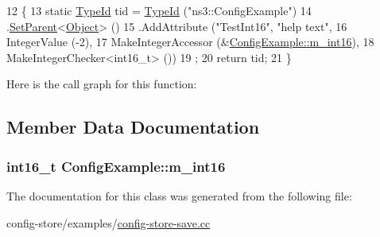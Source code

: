 \begin{DoxyCode}
12                                  \{
13     \textcolor{keyword}{static} \hyperlink{classns3_1_1TypeId}{TypeId} tid = \hyperlink{classns3_1_1TypeId}{TypeId} (\textcolor{stringliteral}{"ns3::ConfigExample"})
14       .\hyperlink{classns3_1_1TypeId_abaaca67ab7d2471067e7c275df0f7309}{SetParent}<\hyperlink{classns3_1_1Object}{Object}> ()
15       .AddAttribute (\textcolor{stringliteral}{"TestInt16"}, \textcolor{stringliteral}{"help text"},
16                      IntegerValue (-2),
17                      MakeIntegerAccessor (&\hyperlink{classConfigExample_a6811c9cb03e7c3f04090bb1fd20861c0}{ConfigExample::m\_int16}),
18                      MakeIntegerChecker<int16\_t> ())
19       ;
20       \textcolor{keywordflow}{return} tid;
21     \}
\end{DoxyCode}


Here is the call graph for this function\+:




\subsection{Member Data Documentation}
\subsubsection[{\texorpdfstring{m\+\_\+int16}{m_int16}}]{\setlength{\rightskip}{0pt plus 5cm}int16\+\_\+t Config\+Example\+::m\+\_\+int16}\hypertarget{classConfigExample_a6811c9cb03e7c3f04090bb1fd20861c0}{}\label{classConfigExample_a6811c9cb03e7c3f04090bb1fd20861c0}


The documentation for this class was generated from the following file\+:\begin{DoxyCompactItemize}
\item 
config-\/store/examples/\hyperlink{config-store-save_8cc}{config-\/store-\/save.\+cc}\end{DoxyCompactItemize}
